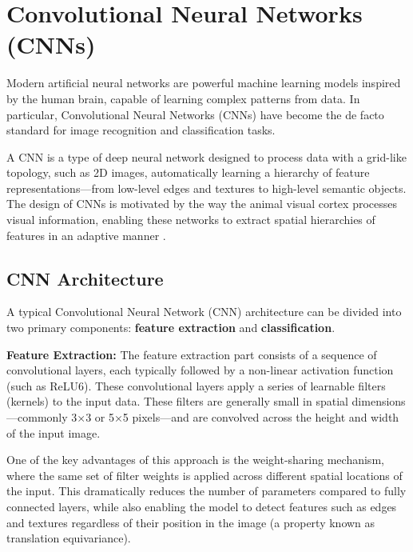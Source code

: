\clearpage





\section{Convolutional Neural Networks (CNNs)}

Modern artificial neural networks are powerful machine learning models inspired by the human brain, capable of learning complex patterns from data. In particular, Convolutional Neural Networks (CNNs) have become the de facto standard for image recognition and classification tasks.

A CNN is a type of deep neural network designed to process data with a grid-like topology, such as 2D images, automatically learning a hierarchy of feature representations---from low-level edges and textures to high-level semantic objects. The design of CNNs is motivated by the way the animal visual cortex processes visual information, enabling these networks to extract spatial hierarchies of features in an adaptive manner \cite{yamashita2018convolutional}.



\subsection{CNN Architecture}

A typical Convolutional Neural Network (CNN) architecture can be divided into two primary components: \textbf{feature extraction} and \textbf{classification}.

\textbf{Feature Extraction:}
\newline
The feature extraction part consists of a sequence of convolutional layers, each typically followed by a non-linear activation function (such as ReLU6). These convolutional layers apply a series of learnable filters (kernels) to the input data. These filters are generally small in spatial dimensions—commonly 3×3 or 5×5 pixels—and are convolved across the height and width of the input image.

One of the key advantages of this approach is the weight-sharing mechanism, where the same set of filter weights is applied across different spatial locations of the input. This dramatically reduces the number of parameters compared to fully connected layers, while also enabling the model to detect features such as edges and textures regardless of their position in the image (a property known as translation equivariance).


